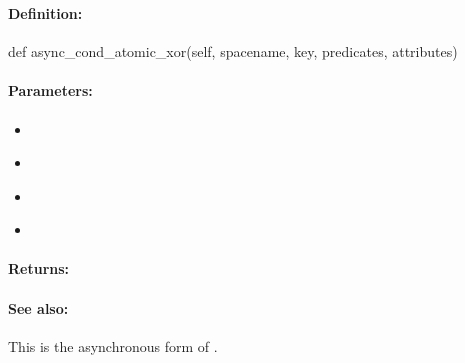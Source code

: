 \pagebreak
\subsubsection{}
\label{api:python:async_cond_atomic_xor}


\paragraph{Definition:}
\begin{pythoncode}
def async_cond_atomic_xor(self, spacename, key, predicates, attributes)
\end{pythoncode}

\paragraph{Parameters:}
\begin{itemize}[noitemsep]
\item {}\\

\item {}\\

\item {}\\

\item {}\\

\end{itemize}

\paragraph{Returns:}


\paragraph{See also:}  This is the asynchronous form of .

\pagebreak
\subsubsection{}
\label{api:python:group_atomic_xor}


